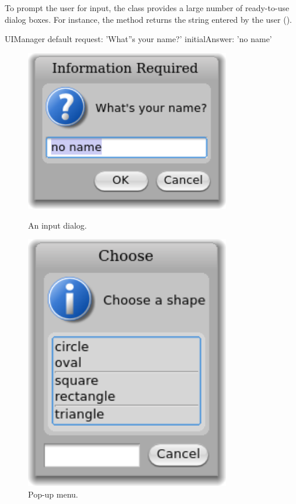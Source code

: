 \documentclass[a4paper,10pt,twoside]{book}
\begin{document}
To prompt the user for input, the  class provides a large number of ready-to-use dialog boxes.
For instance, the  method returns the string entered by the user ().
\begin{code}{}
UIManager default request: 'What''s your name?' initialAnswer: 'no name'
\end{code}

\begin{figure}[htb]
\begin{minipage}{0.48\textwidth}
	\centerline{\includegraphics[width=0.8\textwidth]{dialog}}
	\caption{An input dialog.}
\end{minipage}
\hfill
\begin{minipage}{0.48\textwidth}
	\vfill
	\centerline{\includegraphics [width=0.8\textwidth]{popup}}
	\vfill
	\vspace{4ex}
	\caption{Pop-up menu.}
\end{minipage}
\end{figure}
\end{document}
